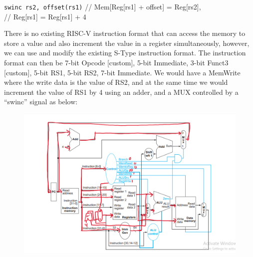 \documentclass[addpoints]{exam}
\begin{document}
\begin{sloppypar}
\begin{questions}
\begin{solution}
\begin{parts}
            \texttt{swinc rs2, offset(rs1)} \hspace*{5mm} // Mem[Reg[rs1] + offset] = Reg[rs2], \\ \hspace*{47mm} // Reg[rs1] = Reg[rs1] + 4
            \begin{subparts}
                \renewcommand{\thesubpart}{\alph{subpart}}
                \subpart There is no existing RISC-V instruction format that can access the memory to store a value and also increment the value in a register simultaneously, however, we can use and modify the existing S-Type instruction format. The instruction format can then be 7-bit Opcode [custom], 5-bit Immediate, 3-bit Funct3 [custom], 5-bit RS1, 5-bit RS2, 7-bit Immediate.
                \subpart We would have a MemWrite where the write data is the value of RS2, and at the same time we would increment the value of RS1 by 4 using an adder, and a MUX controlled by a ``swinc'' signal as below:
                \begin{figure}[H]
                    \centering
                    \includegraphics[scale = 0.5]{Q7_b_swinc.png}
                \end{figure}


\end{subparts}
\end{parts}
\end{solution}
\end{questions}
\end{sloppypar}
\end{document}
